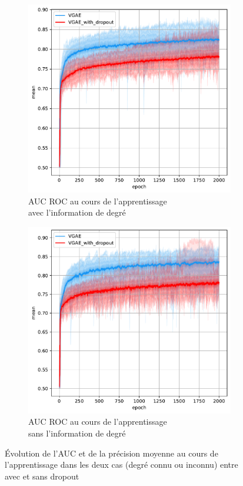 \documentclass{article}
\begin{document}
\begin{figure}[H]
    \begin{subfigure}{0.45\textwidth}
      \includegraphics[width=\textwidth]{graphics/AUCs_degree_dropout_cinf.svg.pdf}
      \centering
      \caption{AUC ROC au cours de l'apprentissage\\ avec l'information de degré}
    \end{subfigure}
    \begin{subfigure}{0.45\textwidth}
      \includegraphics[width=\textwidth]{graphics/AUCs_no_degree_dropout_cinf.svg.pdf}
      \centering
      \caption{AUC ROC au cours de l'apprentissage\\ sans l'information de degré}
    \end{subfigure}
    \caption{Évolution de l'AUC et de la précision moyenne au cours de l'apprentissage dans les deux cas (degré connu ou inconnu) entre avec et sans dropout}
    \label{fig:dropout}
\end{figure}
\end{document}
